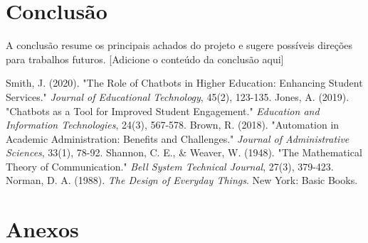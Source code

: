 \documentclass[12pt,a4paper]{article} %
\begin{document}
\section{Conclusão}

\noindent A conclusão resume os principais achados do projeto e sugere possíveis direções para trabalhos futuros. [Adicione o conteúdo da conclusão aqui]

\newpage

\begin{thebibliography}{99}
 Smith, J. (2020). "The Role of Chatbots in Higher Education: Enhancing Student Services." \textit{Journal of Educational Technology}, 45(2), 123-135.
 Jones, A. (2019). "Chatbots as a Tool for Improved Student Engagement." \textit{Education and Information Technologies}, 24(3), 567-578.
 Brown, R. (2018). "Automation in Academic Administration: Benefits and Challenges." \textit{Journal of Administrative Sciences}, 33(1), 78-92.
 Shannon, C. E., \& Weaver, W. (1948). "The Mathematical Theory of Communication." \textit{Bell System Technical Journal}, 27(3), 379-423.
 Norman, D. A. (1988). \textit{The Design of Everyday Things}. New York: Basic Books.
\end{thebibliography}

\newpage

\appendix
\section{Anexos}

\end{document}
